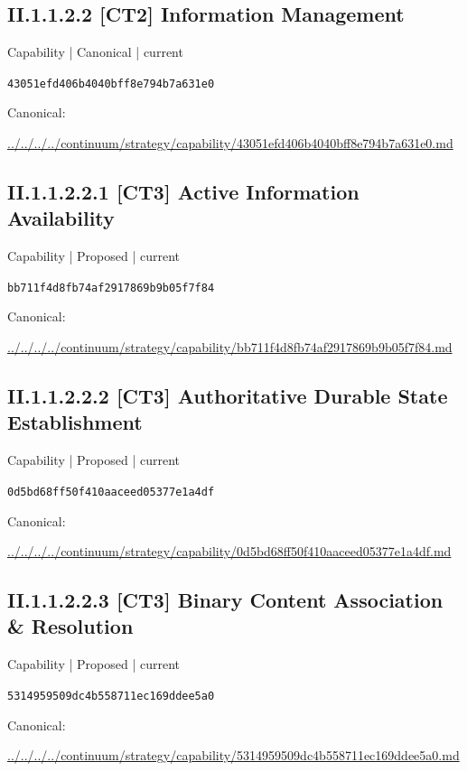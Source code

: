 \documentclass[10pt,a4paper]{article}
\begin{document}
\subsection*{II.1.1.2.2 [CT2] Information Management}
\label{element-43051efd406b4040bff8e794b7a631e0}
{\small Capability | Canonical | current}\par
\texttt{43051efd406b4040bff8e794b7a631e0}\par
Canonical: \par
{\footnotesize\url{../../../../continuum/strategy/capability/43051efd406b4040bff8e794b7a631e0.md}}\par
\subsection*{II.1.1.2.2.1 [CT3] Active Information Availability}
\label{element-bb711f4d8fb74af2917869b9b05f7f84}
{\small Capability | Proposed | current}\par
\texttt{bb711f4d8fb74af2917869b9b05f7f84}\par
Canonical: \par
{\footnotesize\url{../../../../continuum/strategy/capability/bb711f4d8fb74af2917869b9b05f7f84.md}}\par
\subsection*{II.1.1.2.2.2 [CT3] Authoritative Durable State Establishment}
\label{element-0d5bd68ff50f410aaceed05377e1a4df}
{\small Capability | Proposed | current}\par
\texttt{0d5bd68ff50f410aaceed05377e1a4df}\par
Canonical: \par
{\footnotesize\url{../../../../continuum/strategy/capability/0d5bd68ff50f410aaceed05377e1a4df.md}}\par
\subsection*{II.1.1.2.2.3 [CT3] Binary Content Association \& Resolution}
\label{element-5314959509dc4b558711ec169ddee5a0}
{\small Capability | Proposed | current}\par
\texttt{5314959509dc4b558711ec169ddee5a0}\par
Canonical: \par
{\footnotesize\url{../../../../continuum/strategy/capability/5314959509dc4b558711ec169ddee5a0.md}}\par
\end{document}
